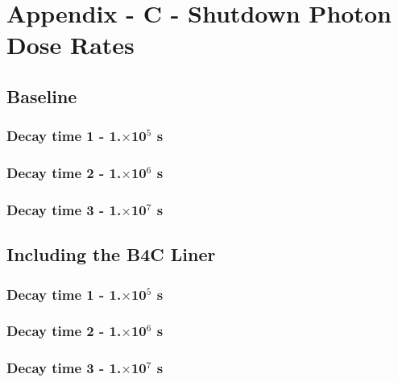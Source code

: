 \documentclass[12pt]{article}
\begin{document}
\section{Appendix - C - Shutdown Photon Dose Rates}
\subsection{Baseline}
\subsubsection{Decay time 1 - 1.$\times$10$^5$ s}

\clearpage
\subsubsection{Decay time 2 - 1.$\times$10$^6$ s}

\clearpage
\subsubsection{Decay time 3 - 1.$\times$10$^7$ s}

\clearpage
\subsection{Including the B4C Liner}
\subsubsection{Decay time 1 - 1.$\times$10$^5$ s}

\clearpage
\subsubsection{Decay time 2 - 1.$\times$10$^6$ s}

\clearpage
\subsubsection{Decay time 3 - 1.$\times$10$^7$ s}

\clearpage
\end{document}
